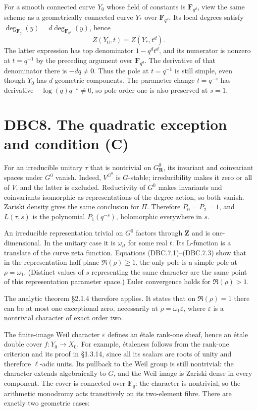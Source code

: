 \documentclass[
]{report}
\begin{document}
For a smooth connected curve \(Y_0\) whose field of constants is
\(\mathbf F_{q^d}\), view the same scheme as a geometrically connected
curve \(Y_*\) over \(\mathbf F_{q^d}\). Its local degrees satisfy
\(\deg_{\mathbf F_q}(y)=d\deg_{\mathbf F_{q^d}}(y)\), hence \[
Z(Y_0,t)=Z(Y_*,t^d).
\tag{DBC.7.4}
\] The latter expression has top denominator \(1-q^d t^d\), and its
numerator is nonzero at \(t=q^{-1}\) by the preceding argument over
\(\mathbf F_{q^d}\). The derivative of that denominator there is
\(-d q\ne0\). Thus the pole at \(t=q^{-1}\) is still simple, even though
\(Y_0\) has \(d\) geometric components. The parameter change
\(t=q^{-s}\) has derivative \(-\log(q)q^{-s}\ne0\), so pole order one is
also preserved at \(s=1\).

\section{DBC8. The quadratic exception and condition
(C)}\label{dbc8.-the-quadratic-exception-and-condition-c}

For an irreducible unitary \(\tau\) that is nontrivial on
\(G_{\mathbf R}^0\), its invariant and coinvariant spaces under \(G^0\)
vanish. Indeed, \(V^{G^0}\) is \(G\)-stable; irreducibility makes it
zero or all of \(V\), and the latter is excluded. Reductivity of \(G^0\)
makes invariants and coinvariants isomorphic as representations of the
degree action, so both vanish. Zariski density gives the same conclusion
for \(\Pi\). Therefore \(P_0=P_2=1\), and \(L(\tau,s)\) is the
polynomial \(P_1(q^{-s})\), holomorphic everywhere in \(s\).

An irreducible representation trivial on \(G^0\) factors through
\(\mathbf Z\) and is one-dimensional. In the unitary case it is
\(\omega_{it}\) for some real \(t\). Its L-function is a translate of
the curve zeta function. Equations (DBC.7.1)--(DBC.7.3) show that in the
representation half-plane \(\Re(\rho)\ge1\), the only pole is a simple
pole at \(\rho=\omega_1\). (Distinct values of \(s\) representing the
same character are the same point of this representation parameter
space.) Euler convergence holds for \(\Re(\rho)>1\).

The analytic theorem §2.1.4 therefore applies. It states that on
\(\Re(\rho)=1\) there can be at most one exceptional zero, necessarily
at \(\rho=\omega_1\varepsilon\), where \(\varepsilon\) is a nontrivial
character of exact order two.

The finite-image Weil character \(\varepsilon\) defines an étale
rank-one sheaf, hence an étale double cover \(f:Y_0\to X_0\). For
example, étaleness follows from the rank-one criterion and its proof in
§1.3.14, since all its scalars are roots of unity and therefore
\(\ell\)-adic units. Its pullback to the Weil group is still nontrivial:
the character extends algebraically to \(G\), and the Weil image is
Zariski dense in every component. The cover is connected over
\(\mathbf F_q\): the character is nontrivial, so the arithmetic
monodromy acts transitively on its two-element fibre. There are exactly
two geometric cases:
\end{document}
